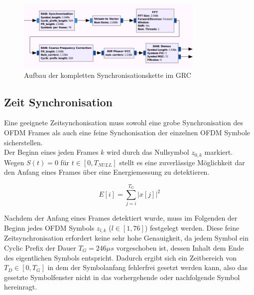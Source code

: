 \begin{figure}[h]
\centering
  \includegraphics[width=0.8\textwidth]{figures/sync_hier_block.png}
	\caption{Aufbau der kompletten Synchronisationskette im \ac{GRC}}
	\label{fig:sync_overview}
\end{figure}
\subsection{Zeit Synchronisation}
Eine geeignete Zeitsynchonisation muss sowohl eine grobe Synchronisation des OFDM Frames als auch eine feine Synchonisation der einzelnen OFDM Symbole sicherstellen. \\

Der Beginn eines jeden Frames $ k $ wird durch das Nullsymbol $z_{0,k}$ markiert. Wegen $S(t) = 0$ für $t \in [0, T_{NULL}]$ stellt es eine zuverlässige Möglichkeit dar den Anfang eines Frames über eine Energiemessung zu detektieren.

\begin{equation}
E[i] = \sum \limits_{j=i}^{T_G}|x[j]|^2
\label{eq:energy}
\end{equation}

Nachdem der Anfang eines Frames detektiert wurde, muss im Folgenden der Beginn jedes OFDM Symbols $z_{l,k}$ ($l \in [1, 76]$) festgelegt werden. Diese feine Zeitsynchronisation erfordert keine sehr hohe Genauigkeit, da jedem Symbol ein Cyclic Prefix der Dauer $T_G = 246 \mu s $ vorgeschoben ist, dessen Inhalt dem Ende des eigentlichen Symbols entspricht. Dadurch ergibt sich ein Zeitbereich von  $T_D \in [0,T_G]$ in dem der Symbolanfang fehlerfrei gesetzt werden kann, also das gesetzte Symbolfenster nicht in das vorhergehende oder nachfolgende Symbol hereinragt.


